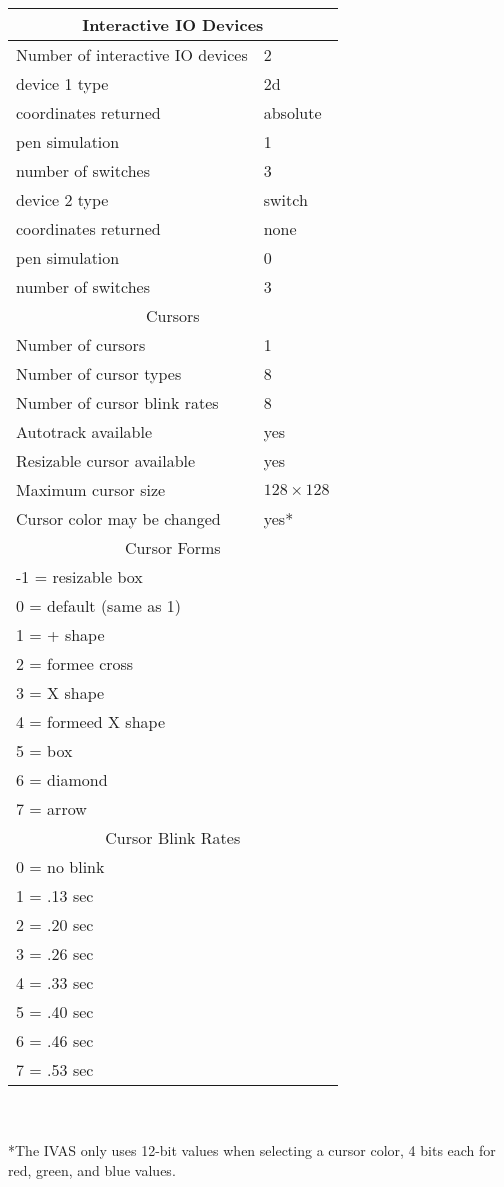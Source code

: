 \begin{tabular}{|l l|}
\hline 
\multicolumn{2}{|c|}{Interactive IO Devices}\\ 
\hline
Number of interactive IO devices & 2\\
device 1 type & 2d\\
coordinates returned & absolute\\
pen simulation & 1\\
number of switches & 3\\
device 2 type & switch\\
coordinates returned & none\\
pen simulation & 0\\
number of switches & 3\\
\hline \hline 
\multicolumn{2}{|c|}{Cursors}\\ 
\hline
Number of cursors & 1\\
Number of cursor types & 8\\
Number of cursor blink rates & 8\\
Autotrack available & yes\\
Resizable cursor available & yes\\
Maximum cursor size & $128 \times 128$\\
Cursor color may be changed & yes*\\
\hline \hline 
\multicolumn{2}{|c|}{Cursor Forms}\\
\hline
-1 = resizable box & \\
0 = default (same as 1) & \\
1 = + shape & \\
2 = formee cross & \\
3 = X shape & \\
4 = formeed X shape & \\
5 = box & \\
6 = diamond & \\
7 = arrow & \\
\hline \hline 
\multicolumn{2}{|c|}{Cursor Blink Rates}\\
\hline
0 = no blink & \\
1 = .13 sec &\\
2 = .20 sec &\\
3 = .26 sec &\\
4 = .33 sec &\\
5 = .40 sec &\\
6 = .46 sec &\\
7 = .53 sec &\\
\hline
\end{tabular}
\\
\\
*The IVAS only uses 12-bit values when selecting a cursor color, 4 bits
each for red, green, and blue values.
\newpage
